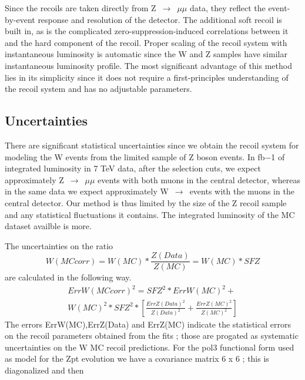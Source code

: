 \documentclass[41pt,a4paper,oneside]{report}
\begin{document}
Since the recoils are taken directly from Z~$\rightarrow$~$\mu\mu$ data, they reflect the event-by-event response and resolution of the detector. The
additional soft recoil is built in, as is the complicated zero-suppression-induced correlations between it and
the hard component of the recoil. Proper scaling of the recoil system with instantaneous luminosity is
automatic since the W and Z samples have similar instantaneous luminosity profile. The most significant
advantage of this method lies in its simplicity since it does not require a first-principles understanding of the
recoil system and has no adjustable parameters.

\subsection{Uncertainties}

There are significant statistical uncertainties since we obtain the recoil system for modeling the W events from the limited sample of Z boson events.
In {\color{magenta}{YYYYY}} fb−1 of integrated luminosity in 7 TeV data, after the selection cuts, we expect
approximately {\color{magenta}{XXXXX}} Z~$\rightarrow$~$\mu\mu$ events with both muons in the central detector, whereas in the same
data we expect approximately {\color{magenta}{ZZZZZ}} W~$\rightarrow$~events with the muons in the central detector. 
Our method is thus limited by the size of the Z recoil sample and any statistical fluctuations it
contains.  The integrated luminosity of the MC dataset availble is {\color{magenta}{KKKKK}} more.


The uncertainties on the ratio
\begin{equation}
W(MCcorr) =  W(MC) * \frac{Z(Data)}{Z(MC)} = W(MC) * SFZ
\end{equation}
are calculated in the following way.
\begin{multline}
ErrW(MCcorr)^2 =  SFZ^2  * ErrW(MC)^2 + \\
				W(MC)^2 * SFZ^2 * [ \frac{ErrZ(Data)^2}{Z(Data)^2} + \frac{ErrZ(MC)^2}{Z(MC)^2} ] 
\end{multline}
The errors ErrW(MC),ErrZ(Data) and  ErrZ(MC) indicate the statistical errors on the recoil parameters obtained from the fits ; those are progated as systematic uncertainties on the W MC recoil predictions.
For the pol3 functional form used as model for the Zpt evolution we have a covariance matrix 6 x 6 ; this is diagonalized and then 
\end{document}
